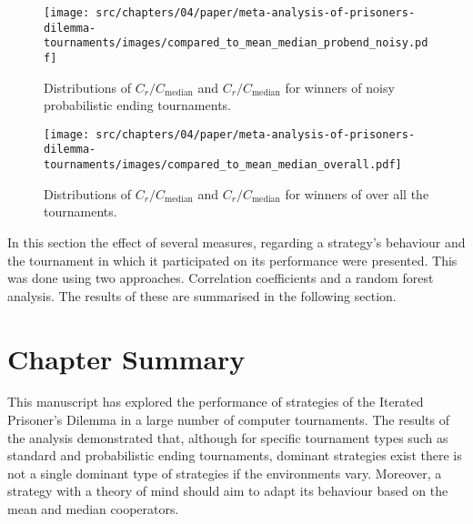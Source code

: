 \begin{figure}[!htbp]
    \centering
    \texttt{[image: src/chapters/04/paper/meta-analysis-of-prisoners-dilemma-tournaments/images/compared\_to\_mean\_median\_probend\_noisy.pdf]}
    \caption{Distributions of \(C_r / C_{\text{median}}\)
    and \(C_r / C_{\text{median}}\) for winners of noisy probabilistic ending tournaments.}\label{fig:mean_median_probend_noisy}
\end{figure}

\begin{figure}[!htbp]
    \centering
    \texttt{[image: src/chapters/04/paper/meta-analysis-of-prisoners-dilemma-tournaments/images/compared\_to\_mean\_median\_overall.pdf]}
    \caption{Distributions of \(C_r / C_{\text{median}}\)
    and \(C_r / C_{\text{median}}\) for winners of over all the tournaments.}\label{fig:mean_median_overall}
\end{figure}

In this section the effect of several measures, regarding a strategy's behaviour
and the tournament in which it participated on its performance were presented.
This was done using two approaches. Correlation coefficients and a random forest
analysis. The results of these are summarised in the following section.

\section{Chapter Summary}\label{section:conclusion}

This manuscript has explored the performance of \numberofstrategies strategies of the Iterated
Prisoner's Dilemma in a large number of computer tournaments. The results of
the analysis demonstrated that, although for specific tournament types such as
standard and probabilistic ending tournaments, dominant strategies exist
there is not a single dominant type of strategies if the environments
vary. Moreover, a strategy with a theory of mind should aim to adapt its behaviour
based on the mean and median cooperators.

